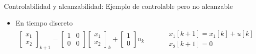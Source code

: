 \documentclass{beamer}
\begin{document}
\begin{frame}{Controlabilidad y alcanzabilidad: Ejemplo de controlable pero no alcanzable}
    \begin{itemize}
        \item En tiempo discreto
        $$
        \begin{matrix}
            \begin{bmatrix}
                x_1 \\
                x_2
            \end{bmatrix}_{k+1}
            =
            \begin{bmatrix}
                1 & 0\\
                0 & 0
            \end{bmatrix}
            \begin{bmatrix}
                x_1 \\
                x_2
            \end{bmatrix}_{k}
            +
            \begin{bmatrix}
                1 \\
                0
            \end{bmatrix}    u_k
            & & &
            \begin{aligned}
                & x_1[k+1] = x_1[k] + u[k] \\
                & x_2[k+1] = 0
            \end{aligned}
        \end{matrix}
        $$
    

\end{itemize}
\end{frame}
\end{document}
